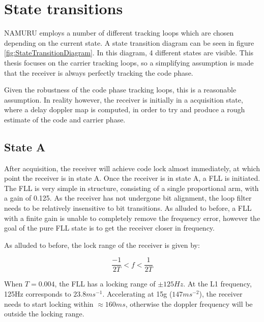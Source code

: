 \chapter{State transitions}
\label{ch:StateTransitions}



\ac{NAMURU} employs a number of different tracking loops which are chosen depending on the current state. A state transition diagram can be seen in figure \ref{fig:StateTransitionDiagram}. In this diagram, 4 different states are visible. This thesis focuses on the carrier tracking loops, so a simplifying assumption is made that the receiver is always perfectly tracking the code phase. 

Given the robustness of the code phase tracking loops, this is a reasonable assumption. In reality however, the receiver is initially in a acquisition state, where a delay doppler map is computed, in order to try and produce a rough estimate of the code and carrier phase.




\section{State A}
After acquisition, the receiver will achieve code lock almost immediately, at which point the receiver is in state A. Once the receiver is in state A, a FLL is initiated. The FLL is very simple in structure, consisting of a single proportional arm, with a gain of 0.125. As the receiver has not undergone bit alignment, the loop filter needs to be relatively insensitive to bit transitions. As alluded to before, a FLL with a finite gain is unable to completely remove the frequency error, however the goal of the pure FLL state is to get the receiver closer in frequency.

As alluded to before, the lock range of the receiver is given by:

\begin{equation}
\frac{-1}{2T} < f < \frac{1}{2T}
\end{equation}

When $T = 0.004$, the FLL has a locking range of $\pm 125Hz$. At the L1 frequency, 125Hz corresponds to $23.8ms^{-1}$. Accelerating at 15g ($147ms^{-2}$), the receiver needs to start locking within $\approx 160ms$, otherwise the doppler frequency will be outside the locking range.

